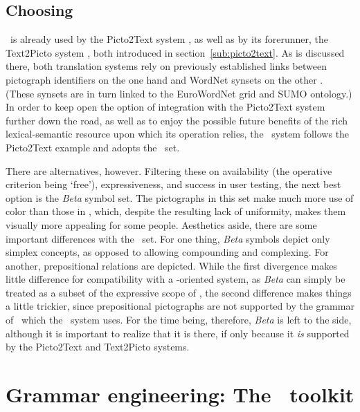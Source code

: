 \subsection{Choosing \sclera}
\label{sub:Beta}

\sclera\ is already used by the Picto2Text system \citep{sevens2015natural}, as
well as by its forerunner, the Text2Picto system
\citep{vandeghinste2015translating}, both introduced in
section~\ref{sub:picto2text}. As is discussed there, both translation systems
rely on previously established links between pictograph identifiers on the one
hand and WordNet synsets on the other \citep{vandeghinste2014linking}. (These
synsets are in turn linked to the EuroWordNet grid and SUMO ontology.) In order
to keep open the option of integration with the Picto2Text system further down
the road, as well as to enjoy the possible future benefits of the rich
lexical-semantic resource upon which its operation relies, the \depicto\ system
follows the Picto2Text example and adopts the \sclera\ set.

There are alternatives, however. Filtering these on availability (the operative
criterion being `free'), expressiveness, and success in user testing, the next
best option is the \emph{Beta} symbol set. The pictographs in this set make
much more use of color than those in \sclera, which, despite the resulting lack
of uniformity, makes them visually more appealing for some people. Aesthetics
aside, there are some important differences with the \sclera\ set. For one
thing, \emph{Beta} symbols depict only simplex concepts, as opposed to allowing
compounding and complexing. For another, prepositional relations are depicted.
While the first divergence makes little difference for compatibility with a
\sclera-oriented system, as \emph{Beta} can simply be treated as a subset of
the expressive scope of \sclera, the second difference makes things a little
trickier, since prepositional pictographs are not supported by the grammar of
\sclera\ which the \depicto\ system uses. For the time being, therefore,
\emph{Beta} is left to the side, although it is important to realize that it is
there, if only because it \emph{is} supported by the Picto2Text and Text2Picto
systems.

\section{Grammar engineering: The \delphin\ toolkit}
\label{sec:delph-in}

